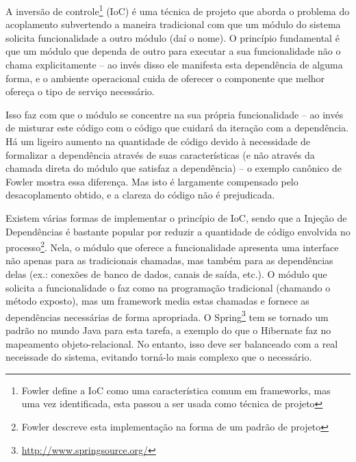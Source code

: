 \documentclass{abnt}
\begin{document}
A inversão de controle\footnote{Fowler\cite{FowlerIoc} define a IoC como uma característica comum em frameworks, mas uma vez identificada, esta passou a ser usada como técnica de projeto } (IoC) é uma técnica de projeto que aborda o problema do acoplamento subvertendo a maneira tradicional com que um módulo do sistema solicita funcionalidade a outro módulo (daí o nome). O princípio fundamental é que um módulo que dependa de outro para executar a sua funcionalidade não o chama explicitamente – ao invés disso ele manifesta esta dependência de alguma forma, e o ambiente operacional cuida de oferecer o componente que melhor ofereça o tipo de serviço necessário.

Isso faz com que o módulo se concentre na sua própria funcionalidade – ao invés de misturar este código com o código que cuidará da iteração com a dependência. Há um ligeiro aumento na quantidade de código devido à necessidade de formalizar a dependência através de suas características (e não através da chamada direta do módulo que satisfaz a dependência) – o exemplo canônico de Fowler mostra essa diferença. Mas isto é largamente compensado pelo desacoplamento obtido, e a clareza do código não é prejudicada.

Existem várias formas de implementar o princípio de IoC, sendo que a Injeção de Dependências é bastante popular por reduzir a quantidade de código envolvida no processo\footnote{Fowler descreve esta implementação na forma de um padrão de projeto\cite{FowlerInjdep}}. Nela, o módulo que oferece a funcionalidade apresenta uma interface não apenas para as tradicionais chamadas, mas também para as dependências delas (ex.: conexões de banco de dados, canais de saída, etc.). O módulo que solicita a funcionalidade o faz como na programação tradicional (chamando o método exposto), mas um framework media estas chamadas e fornece as dependências necessárias de forma apropriada. O Spring\footnote{\url{http://www.springsource.org/}} tem se tornado um padrão no mundo Java para esta tarefa, a exemplo do que o Hibernate faz no mapeamento objeto-relacional. No entanto, isso deve ser balanceado com a real neceissade do sistema, evitando torná-lo mais complexo que o necessário.




\end{document}
